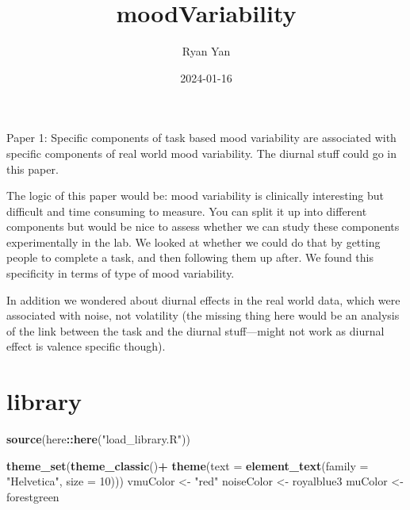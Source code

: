 \documentclass[
]{article}
\title{moodVariability}
\author{Ryan Yan}
\date{2024-01-16}
\newenvironment{Shaded}{\begin{snugshade}}{\end{snugshade}}
\newcommand{\AttributeTok}[1]{\textcolor[rgb]{0.13,0.29,0.53}{#1}}
\newcommand{\DecValTok}[1]{\textcolor[rgb]{0.00,0.00,0.81}{#1}}
\newcommand{\FunctionTok}[1]{\textcolor[rgb]{0.13,0.29,0.53}{\textbf{#1}}}
\newcommand{\NormalTok}[1]{#1}
\newcommand{\OtherTok}[1]{\textcolor[rgb]{0.56,0.35,0.01}{#1}}
\newcommand{\SpecialCharTok}[1]{\textcolor[rgb]{0.81,0.36,0.00}{\textbf{#1}}}
\newcommand{\StringTok}[1]{\textcolor[rgb]{0.31,0.60,0.02}{#1}}
\begin{document}
\maketitle

Paper 1: Specific components of task based mood variability are
associated with specific components of real world mood variability. The
diurnal stuff could go in this paper.

The logic of this paper would be: mood variability is clinically
interesting but difficult and time consuming to measure. You can split
it up into different components but would be nice to assess whether we
can study these components experimentally in the lab. We looked at
whether we could do that by getting people to complete a task, and then
following them up after. We found this specificity in terms of type of
mood variability.

In addition we wondered about diurnal effects in the real world data,
which were associated with noise, not volatility (the missing thing here
would be an analysis of the link between the task and the diurnal
stuff---might not work as diurnal effect is valence specific though).

\hypertarget{library}{%
\section{library}\label{library}}

\begin{Shaded}
\begin{Highlighting}[]
\FunctionTok{source}\NormalTok{(here}\SpecialCharTok{::}\FunctionTok{here}\NormalTok{(}\StringTok{"load\_library.R"}\NormalTok{))}
\end{Highlighting}
\end{Shaded}

\begin{Shaded}
\begin{Highlighting}[]
\FunctionTok{theme\_set}\NormalTok{(}\FunctionTok{theme\_classic}\NormalTok{()}\SpecialCharTok{+}
          \FunctionTok{theme}\NormalTok{(}\AttributeTok{text =} \FunctionTok{element\_text}\NormalTok{(}\AttributeTok{family =} \StringTok{"Helvetica"}\NormalTok{, }\AttributeTok{size =} \DecValTok{10}\NormalTok{)))}
\NormalTok{vmuColor }\OtherTok{\textless{}{-}} \StringTok{"red"}
\NormalTok{noiseColor }\OtherTok{\textless{}{-}} \StringTok{\textquotesingle{}royalblue3\textquotesingle{}}
\NormalTok{muColor }\OtherTok{\textless{}{-}} \StringTok{\textquotesingle{}forestgreen\textquotesingle{}}
\end{Highlighting}
\end{Shaded}
\end{document}
